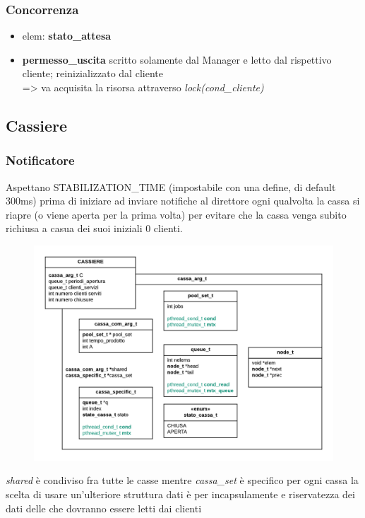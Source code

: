 \documentclass[11pt, a4paper]{article}
\begin{document}
\subsubsection{Concorrenza}
\begin{itemize}
\item elem: \textbf{stato\_attesa}
\item \textbf{permesso\_uscita} scritto solamente dal Manager e letto dal rispettivo cliente; reinizializzato dal cliente\\
=> \hspace{10mm} va acquisita la risorsa attraverso \textit{lock(cond\_cliente)} 

\end{itemize}


\subsection{Cassiere}
\subsubsection{Notificatore}
Aspettano STABILIZATION\_TIME (impostabile con una define, di default 300ms) prima di iniziare ad inviare notifiche al direttore ogni qualvolta la cassa si riapre (o viene aperta per la prima volta) per evitare che la cassa venga subito richiusa a casua dei suoi iniziali 0 clienti.

\begin{figure}[h]
	\centering
	\includegraphics[scale=0.8]{cassa.png}
	\label{fig:cassa}
\end{figure}

\textit{shared} è condiviso fra tutte le casse mentre \textit{cassa\_set} è specifico per ogni cassa
la scelta di  usare un'ulteriore struttura dati è 
per  incapsulamente e riservatezza dei dati 
delle che dovranno essere letti dai clienti 
\end{document}
